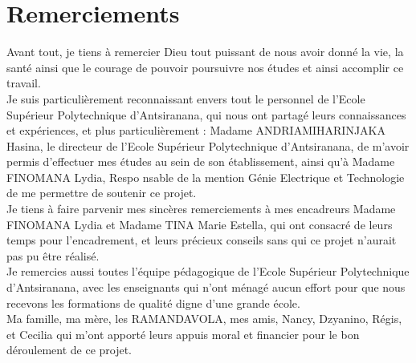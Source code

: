 
\chapter*{Remerciements}
	
Avant tout, je tiens à remercier Dieu tout puissant de nous avoir donné la vie, la santé ainsi que le courage de pouvoir poursuivre nos études et ainsi accomplir ce travail.\\[1cm] Je suis particulièrement reconnaissant envers tout le personnel de l’Ecole Supérieur Polytechnique d’Antsiranana, qui nous ont partagé leurs connaissances et expériences, et plus particulièrement :
Madame ANDRIAMIHARINJAKA Hasina, le directeur de l’Ecole Supérieur Polytechnique d’Antsiranana, de
m’avoir permis d’effectuer mes études au sein de son établissement, ainsi qu’à Madame FINOMANA Lydia, Respo nsable de la  mention Génie Electrique et Technologie de me permettre de soutenir ce projet.\\[1cm]
Je tiens à faire parvenir mes sincères remerciements à mes encadreurs Madame FINOMANA Lydia et Madame TINA Marie Estella, qui ont consacré de leurs temps pour l'encadrement, et leurs précieux conseils sans qui ce projet n’aurait pas pu être réalisé.
\\[1cm]
Je remercies aussi toutes l’équipe pédagogique de l’Ecole Supérieur Polytechnique d’Antsiranana, avec les enseignants qui n’ont ménagé aucun effort pour que nous recevons les formations de qualité digne d’une grande école.\\[1cm]
Ma famille, ma mère, les RAMANDAVOLA, mes amis, Nancy, Dzyanino, Régis, et Cecilia qui m'ont apporté leurs appuis moral et financier pour le bon déroulement de ce projet.

\setcounter{page}{1}






